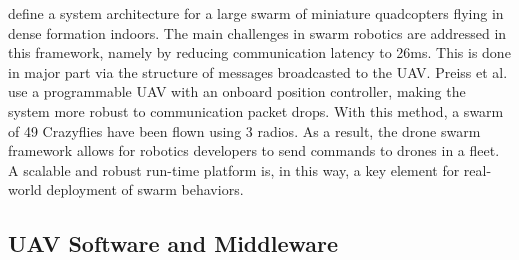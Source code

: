 \cite{phan_hönig_ayanian_2018} \textit{}
\hspace*{1cm} define a system architecture for a large swarm of miniature quadcopters flying in dense formation indoors. 
The main challenges in swarm robotics are addressed in this framework, namely by reducing communication latency to 26ms.
This is done in major part via the structure of messages broadcasted to the UAV. Preiss et al. \cite{phan_hönig_ayanian_2018} use a programmable UAV with an onboard position controller, making the system more robust to communication packet drops. With this method, a swarm of 49 Crazyflies have been flown using 3 radios. 
As a result, the drone swarm framework allows for robotics developers to send commands to drones in a fleet. A scalable and robust run-time platform is, in this way, a key element for real-world deployment of swarm behaviors.

\subsection{UAV Software and Middleware}






